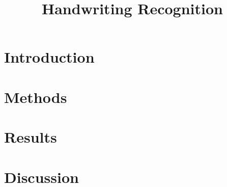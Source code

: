 \documentclass[conference,compsoc]{IEEEtran}
\begin{document}
\title{Handwriting Recognition}
\author{
\and
{}
}

\maketitle



\section{Introduction}
\label{s:introduction}


\section{Methods}
\label{s:methods}


\section{Results}
\label{s:results}


\section{Discussion}
\label{s:discussion}


\cite{russell1995modern}



\end{document}
